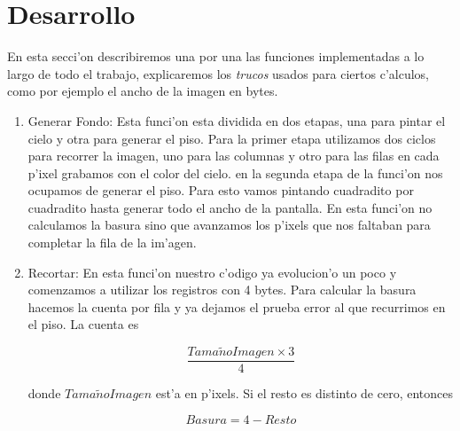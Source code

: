\section{Desarrollo}
En esta secci'on describiremos una por una las funciones implementadas a lo largo de todo el trabajo, explicaremos los \textit{trucos} usados para ciertos c'alculos, como por ejemplo el ancho de la imagen en bytes.

\begin{enumerate}
 \item Generar Fondo:
Esta funci'on esta dividida en dos etapas, una para pintar el cielo y otra para generar el piso.
Para la primer etapa utilizamos dos ciclos para recorrer la imagen, uno para las columnas y otro para las filas en cada p'ixel grabamos con el color del cielo.
en la segunda etapa de la funci'on nos ocupamos de generar el piso.  Para esto vamos pintando cuadradito por cuadradito hasta generar todo el ancho de la pantalla.  En esta funci'on no calculamos la basura sino que avanzamos los p'ixels que nos faltaban para completar la fila de la im'agen.
\item Recortar:
En esta funci'on nuestro c'odigo ya evolucion'o un poco y comenzamos a utilizar los registros con 4 bytes.  Para calcular la basura hacemos la cuenta por fila y ya dejamos el prueba error al que recurrimos en el piso.  La cuenta es 

$$
\frac{Tama\tilde{n}oImagen \times 3}{4}
$$

donde $Tama\tilde{n}oImagen$ est'a en p'ixels.  Si el resto es distinto de cero, entonces 

$$
Basura = 4 - Resto
$$


\end{enumerate}
